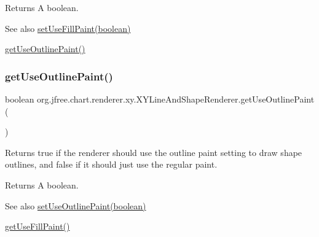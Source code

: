 \begin{DoxyReturn}{Returns}
A boolean.
\end{DoxyReturn}
\begin{DoxySeeAlso}{See also}
\mbox{\hyperlink{classorg_1_1jfree_1_1chart_1_1renderer_1_1xy_1_1_x_y_line_and_shape_renderer_a10b363b55780c53c8aff57f0f4bcc3f6}{set\+Use\+Fill\+Paint(boolean)}} 

\mbox{\hyperlink{classorg_1_1jfree_1_1chart_1_1renderer_1_1xy_1_1_x_y_line_and_shape_renderer_a4c0299cee69c99c4a119ff4e945e0b3d}{get\+Use\+Outline\+Paint()}} 
\end{DoxySeeAlso}
\mbox{\label{classorg_1_1jfree_1_1chart_1_1renderer_1_1xy_1_1_x_y_line_and_shape_renderer_a4c0299cee69c99c4a119ff4e945e0b3d}} 
\subsubsection{\texorpdfstring{get\+Use\+Outline\+Paint()}{getUseOutlinePaint()}}
{\footnotesize\ttfamily boolean org.\+jfree.\+chart.\+renderer.\+xy.\+X\+Y\+Line\+And\+Shape\+Renderer.\+get\+Use\+Outline\+Paint (\begin{DoxyParamCaption}{ }\end{DoxyParamCaption})}

Returns {\ttfamily true} if the renderer should use the outline paint setting to draw shape outlines, and {\ttfamily false} if it should just use the regular paint.

\begin{DoxyReturn}{Returns}
A boolean.
\end{DoxyReturn}
\begin{DoxySeeAlso}{See also}
\mbox{\hyperlink{classorg_1_1jfree_1_1chart_1_1renderer_1_1xy_1_1_x_y_line_and_shape_renderer_a2cea4417beb098e96e8f15c7268d5ad7}{set\+Use\+Outline\+Paint(boolean)}} 

\mbox{\hyperlink{classorg_1_1jfree_1_1chart_1_1renderer_1_1xy_1_1_x_y_line_and_shape_renderer_a8bd7907c3f07dbe4495fd3f0d7a7e4d4}{get\+Use\+Fill\+Paint()}} 
\end{DoxySeeAlso}
\mbox{\label{classorg_1_1jfree_1_1chart_1_1renderer_1_1xy_1_1_x_y_line_and_shape_renderer_a48088d03f5e68ef87da30708f85cb9d9}} 
